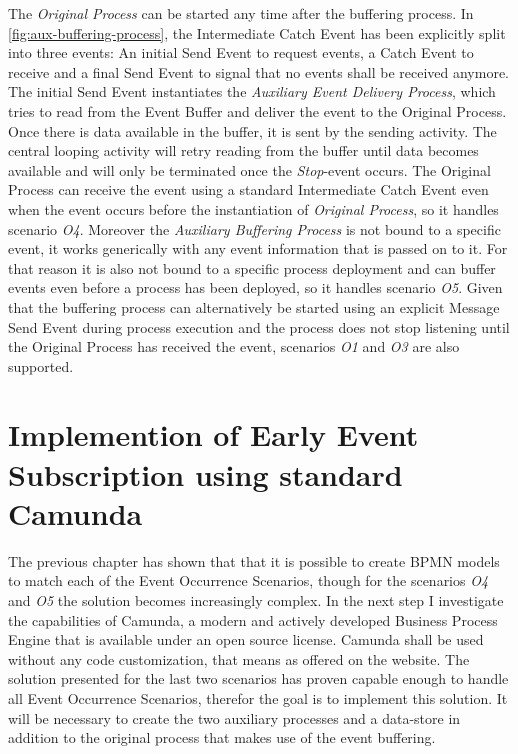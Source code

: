 
The \textit{Original Process} can be started any time after the buffering process. In \autoref{fig:aux-buffering-process}, the Intermediate Catch Event has been explicitly split into three events: An initial Send Event to request events, a Catch Event to receive and a final Send Event to signal that no events shall be received anymore.
The initial Send Event instantiates the \textit{Auxiliary Event Delivery Process}, which tries to read from the Event Buffer and deliver the event to the Original Process. Once there is data available in the buffer, it is sent by the sending activity. The central looping activity will retry reading from the buffer until data becomes available and will only be terminated once the \textit{Stop}-event occurs. 
The Original Process can receive the event using a standard Intermediate Catch Event even when the event occurs before the instantiation of \textit{Original Process}, so it handles scenario \textit{O4}. 
Moreover the \textit{Auxiliary Buffering Process} is not bound to a specific event, it works generically with any event information that is passed on to it. For that reason it is also not bound to a specific process deployment and can buffer events even before a process has been deployed, so it handles scenario \textit{O5}.
Given that the buffering process can alternatively be started using an explicit Message Send Event during process execution and the process does not stop listening until the Original Process has received the event, scenarios \textit{O1} and \textit{O3} are also supported.


\section{Implemention of Early Event Subscription using standard Camunda}
The previous chapter has shown that that it is possible to create BPMN models to match each of the Event Occurrence Scenarios, though for the scenarios \textit{O4} and \textit{O5} the solution becomes increasingly complex.
In the next step I investigate the capabilities of Camunda, a modern and actively developed Business Process Engine that is available under an open source license.
Camunda shall be used without any code customization, that means as offered on the website.
The solution presented for the last two scenarios has proven capable enough to handle all Event Occurrence Scenarios, therefor the goal is to implement this solution. It will be necessary to create the two auxiliary processes and a data-store in addition to the original process that makes use of the event buffering.

